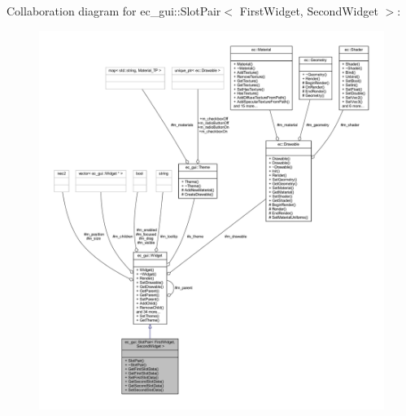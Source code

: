 Collaboration diagram for ec\+\_\+gui\+:\+:Slot\+Pair$<$ First\+Widget, Second\+Widget $>$\+:
\nopagebreak
\begin{figure}[H]
\begin{center}
\leavevmode
\includegraphics[width=350pt]{classec__gui_1_1_slot_pair__coll__graph}
\end{center}
\end{figure}

